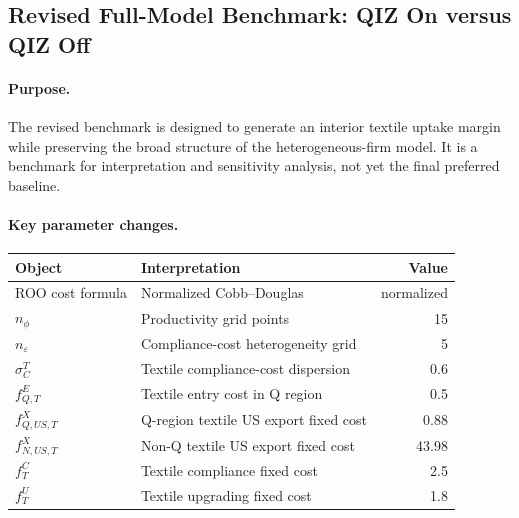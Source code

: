\documentclass[12pt]{article}
\begin{document}
\subsection{Revised Full-Model Benchmark: QIZ On versus QIZ Off}

\paragraph{Purpose.}
The revised benchmark is designed to generate an interior textile uptake margin
while preserving the broad structure of the heterogeneous-firm model. It is a
benchmark for interpretation and sensitivity analysis, not yet the final
preferred baseline.

\paragraph{Key parameter changes.}
\begin{center}
\begin{tabular}{llr}
\toprule
Object & Interpretation & Value \\
\midrule
ROO cost formula & Normalized Cobb--Douglas & normalized \\
$n_{\phi}$ & Productivity grid points & 15 \\
$n_{\varepsilon}$ & Compliance-cost heterogeneity grid & 5 \\
$\sigma_C^T$ & Textile compliance-cost dispersion & 0.6 \\
$f^E_{Q,T}$ & Textile entry cost in Q region & 0.5 \\
$f^X_{Q,US,T}$ & Q-region textile US export fixed cost & 0.88 \\
$f^X_{N,US,T}$ & Non-Q textile US export fixed cost & 43.98 \\
$f^C_T$ & Textile compliance fixed cost & 2.5 \\
$f^U_T$ & Textile upgrading fixed cost & 1.8 \\
\bottomrule
\end{tabular}
\end{center}
\end{document}
